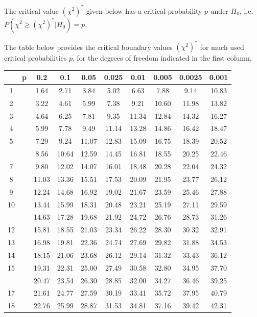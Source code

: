 \documentclass[
]{book}
\begin{document}
The critical value \((\chi^2)^*\) given below has a critical probability \(p\) under
\(H_0\), i.e.~\(P(\chi^2 \geq (\chi^2)^*|H_0)=p\).

The table below provides the critical boundary values \((\chi^2)^*\) for much used critical probabilities \(p\), for the degrees of freedom indicated in the first column.

\begin{tabular}{cccccccccc}
\toprule
 & p & 0.2 & 0.1 & 0.05 & 0.025 & 0.01 & 0.005 & 0.0025 & 0.001\\
\midrule
1 &  & 1.64 & 2.71 & 3.84 & 5.02 & 6.63 & 7.88 & 9.14 & 10.83\\
2 &  & 3.22 & 4.61 & 5.99 & 7.38 & 9.21 & 10.60 & 11.98 & 13.82\\
3 &  & 4.64 & 6.25 & 7.81 & 9.35 & 11.34 & 12.84 & 14.32 & 16.27\\
4 &  & 5.99 & 7.78 & 9.49 & 11.14 & 13.28 & 14.86 & 16.42 & 18.47\\
5 &  & 7.29 & 9.24 & 11.07 & 12.83 & 15.09 & 16.75 & 18.39 & 20.52\\
\addlinespace
6 &  & 8.56 & 10.64 & 12.59 & 14.45 & 16.81 & 18.55 & 20.25 & 22.46\\
7 &  & 9.80 & 12.02 & 14.07 & 16.01 & 18.48 & 20.28 & 22.04 & 24.32\\
8 &  & 11.03 & 13.36 & 15.51 & 17.53 & 20.09 & 21.95 & 23.77 & 26.12\\
9 &  & 12.24 & 14.68 & 16.92 & 19.02 & 21.67 & 23.59 & 25.46 & 27.88\\
10 &  & 13.44 & 15.99 & 18.31 & 20.48 & 23.21 & 25.19 & 27.11 & 29.59\\
\addlinespace
11 &  & 14.63 & 17.28 & 19.68 & 21.92 & 24.72 & 26.76 & 28.73 & 31.26\\
12 &  & 15.81 & 18.55 & 21.03 & 23.34 & 26.22 & 28.30 & 30.32 & 32.91\\
13 &  & 16.98 & 19.81 & 22.36 & 24.74 & 27.69 & 29.82 & 31.88 & 34.53\\
14 &  & 18.15 & 21.06 & 23.68 & 26.12 & 29.14 & 31.32 & 33.43 & 36.12\\
15 &  & 19.31 & 22.31 & 25.00 & 27.49 & 30.58 & 32.80 & 34.95 & 37.70\\
\addlinespace
16 &  & 20.47 & 23.54 & 26.30 & 28.85 & 32.00 & 34.27 & 36.46 & 39.25\\
17 &  & 21.61 & 24.77 & 27.59 & 30.19 & 33.41 & 35.72 & 37.95 & 40.79\\
18 &  & 22.76 & 25.99 & 28.87 & 31.53 & 34.81 & 37.16 & 39.42 & 42.31\\

\end{tabular}
\end{document}
